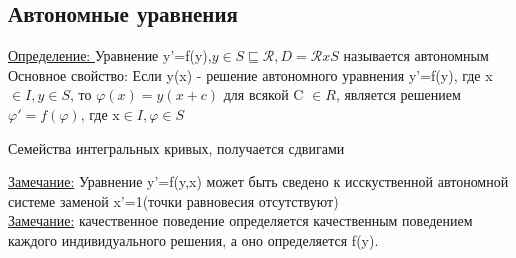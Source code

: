 \documentclass[12pt]{article}
\begin{document}
  \subsection*{Автономные уравнения}
  \underline{Определение: } Уравнение y'=f(y),$y \in S \sqsubseteq \mathcal{R},D=\mathcal{R}xS$
  называется автономным\\
  Основное свойство: Если y(x) - решение автономного уравнения y'=f(y), где x $\in I,y \in S$,
  то $\varphi(x)=y(x+c)$ для всякой C $\in R$, является решением $\varphi'=f(\varphi)$,
  где x$\in I,\varphi \in S$\\
  \begin{center}
    Семейства интегральных кривых, получается сдвигами
  \end{center}
  \underline{Замечание:} Уравнение y'=f(y,x) может быть сведено к исскуственной автономной системе
  заменой x'=1(точки равновесия отсутствуют)\\
  \underline{Замечание:} качественное поведение определяется качественным поведением
  каждого индивидуального решения, а оно определяется f(y).
\end{document}
